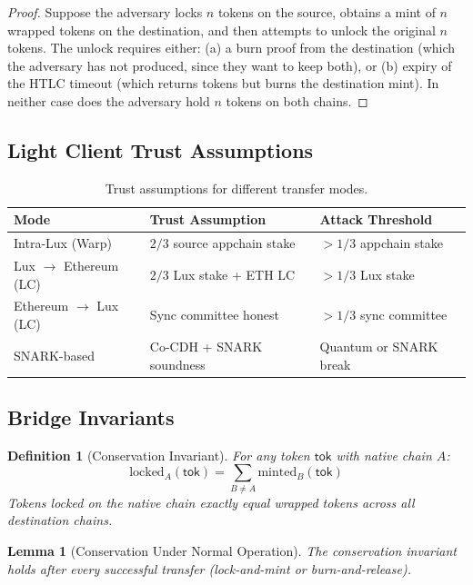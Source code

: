 \documentclass[11pt,a4paper]{article}
\newtheorem{lemma}[theorem]{Lemma}
\newtheorem{definition}{Definition}
\begin{document}
\begin{proof}
Suppose the adversary locks $n$ tokens on the source, obtains a mint of $n$ wrapped tokens on the destination, and then attempts to unlock the original $n$ tokens. The unlock requires either: (a) a burn proof from the destination (which the adversary has not produced, since they want to keep both), or (b) expiry of the HTLC timeout (which returns tokens but burns the destination mint). In neither case does the adversary hold $n$ tokens on both chains.
\end{proof}

\subsection{Light Client Trust Assumptions}

\begin{table}[H]
\centering
\caption{Trust assumptions for different transfer modes.}
\label{tab:trust}
\begin{tabular}{p{3.5cm}p{4cm}p{4cm}}
\toprule
\textbf{Mode} & \textbf{Trust Assumption} & \textbf{Attack Threshold} \\
\midrule
Intra-Lux (Warp) & $2/3$ source appchain stake & $> 1/3$ appchain stake \\
Lux $\to$ Ethereum (LC) & $2/3$ Lux stake + ETH LC & $> 1/3$ Lux stake \\
Ethereum $\to$ Lux (LC) & Sync committee honest & $> 1/3$ sync committee \\
SNARK-based & Co-CDH + SNARK soundness & Quantum or SNARK break \\
\bottomrule
\end{tabular}
\end{table}

\subsection{Bridge Invariants}

\begin{definition}[Conservation Invariant]
For any token $\mathsf{tok}$ with native chain $A$:
\begin{equation}
    \text{locked}_A(\mathsf{tok}) = \sum_{B \neq A} \text{minted}_B(\mathsf{tok})
\end{equation}
Tokens locked on the native chain exactly equal wrapped tokens across all destination chains.
\end{definition}

\begin{lemma}[Conservation Under Normal Operation]
The conservation invariant holds after every successful transfer (lock-and-mint or burn-and-release).
\end{lemma}
\end{document}
